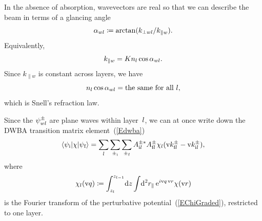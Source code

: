 In the absence of absorption,
wavevectors are real
so that we can describe the beam in terms of a glancing angle
\begin{equation}\label{Edef_alpha}
  \alpha_{wl}\coloneqq \arctan(k_{\perp wl}/k_{\parallel w}).  
\end{equation}
Equivalently,
\begin{equation}
  k_{\parallel w}=K n_l \cos\alpha_{wl}. 
\end{equation}
Since $k_{\parallel w}$ is constant across layers,
we have
\begin{equation}\label{ESnell}
  n_l \cos\alpha_{wl} = \text{the same for all }l,
\end{equation}
which is Snell's refraction law.

Since the $\psi^\pm_{wl}$ are plane waves within layer~$l$,
we can at once write down the DWBA transition matrix element~(\ref{Edwba})
%
\begin{equation}\label{Edwba_ml0}
  \left\langle \psi_{\text{i}}|\chi|\psi_{\text{f}}\right\rangle
  = \sum_{l} \sum_{\pm_{\text{i}}} \sum_{\pm_{\text{f}}}
    A^{\pm *}_{\text{i} l} A^\pm_{\text{f} l} 
     \chi_l(\text{v}{k}^\pm_{\text{f} l}-\text{v}{k}^\pm_{\text{i} l}),
\end{equation}
where
\begin{equation}\label{Echij}
  \chi_l(\text{v}{q})
  \coloneqq  \int_{z_l}^{z_{l-1}}\!\text{d} z \int\!\text{d}^2r_\parallel\, \text{e}^{i\text{v}{q}\,\text{v}{r}}\chi(\text{v}{r})
\end{equation}
%
is the Fourier transform
of the perturbative potential~(\ref{EChiGraded}),
restricted to one layer.


